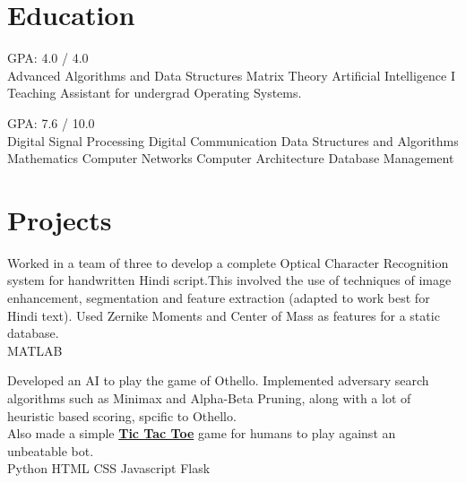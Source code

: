 \documentclass[]{deedy-resume-openfont}
\begin{document}
%
%

\section{Education}
 GPA: 4.0 / 4.0\\

\textbullet{} Advanced Algorithms and Data Structures \textbullet{} Matrix Theory
\textbullet{} Artificial Intelligence I
\textbullet{} \\
\textbullet{} Teaching Assistant for undergrad Operating Systems.
\sectionsep

GPA: 7.6 / 10.0\\
\textbullet{} Digital Signal Processing 
\textbullet{} Digital Communication
\textbullet{} Data Structures and Algorithms
\textbullet{} Mathematics
\textbullet{} Computer Networks
\textbullet{} Computer Architecture
\textbullet{} Database Management
\textbullet{}
\sectionsep


\section{Projects}
Worked in a team of three to develop a complete Optical Character Recognition system for handwritten Hindi script.This involved the use of
techniques of image enhancement, segmentation and feature extraction (adapted to work best for Hindi text). Used Zernike Moments and Center of Mass as features for a static database.\\
\textbullet{} MATLAB \textbullet{}
\sectionsep

Developed an AI to play the game of Othello. Implemented adversary search algorithms such as Minimax and Alpha-Beta Pruning, along with a lot of heuristic based scoring, spcific to Othello.\\
Also made a simple {\selectfont\bfseries{\href{http://tictactoeapp.herokuapp.com/}{Tic Tac Toe}}} game for humans to play against an unbeatable bot.\\
\textbullet{} Python \textbullet{} HTML \textbullet{} CSS \textbullet{} Javascript \textbullet{} Flask \textbullet{}
\sectionsep
\end{document}
